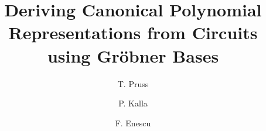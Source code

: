 \documentclass{llncs}
\begin{document}
\title{{Deriving Canonical Polynomial Representations from Circuits using Gr\"obner Bases}}

\author{
T. Pruss \and P. Kalla \and F. Enescu
}


\maketitle







%

\end{document}

